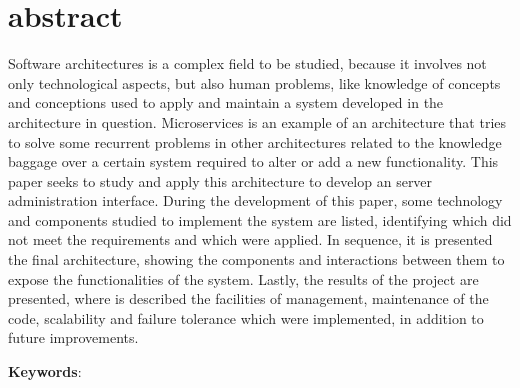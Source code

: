 \chapter*{abstract}

\noindent  Software architectures is a complex field to be studied,
because it involves not only technological aspects, but also human
problems, like knowledge of concepts and conceptions used to apply
and maintain a system developed in the architecture in question.
Microservices is an example of an architecture that tries to solve
some recurrent problems in other architectures related to the knowledge
baggage over a certain system required to alter or add a new functionality.
This paper seeks to study and apply this architecture to develop an server
administration interface. During the development of this paper, some
technology and components studied to implement the system are listed,
identifying which did not meet the requirements and which were applied.
In sequence, it is presented the final architecture, showing the components
and interactions between them to expose the functionalities of the system.
Lastly, the results of the project are presented, where is described the
facilities of management, maintenance of the code, scalability and failure
tolerance which were implemented, in addition to future improvements.

\noindent \textbf{Keywords}: \enUSKeyword
